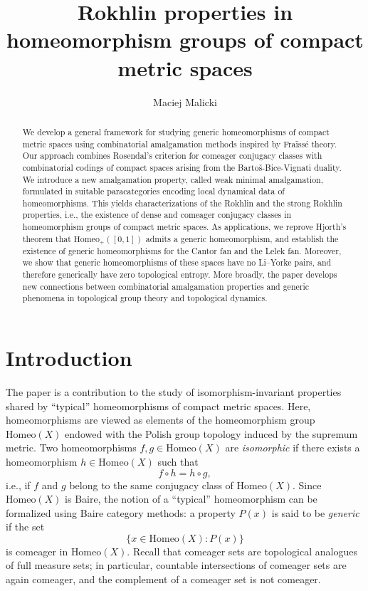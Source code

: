 \documentclass[12pt]{amsart}
\author[M. Malicki]{Maciej Malicki}
\numberwithin{equation}{section}
\theoremstyle{plain}
\theoremstyle{definition}
\newcommand \Homeo{ \mbox{Homeo}}
\begin{document}
	
\title[Rokhlin properties]{Rokhlin properties in homeomorphism groups of  compact metric spaces}
	
\begin{abstract}
We develop a general framework for studying generic homeomorphisms of compact metric spaces using combinatorial amalgamation methods inspired by Fraïssé theory. Our approach combines Rosendal’s criterion for comeager conjugacy classes with combinatorial codings of compact spaces arising from the Bartoš-Bice-Vignati duality. We introduce a new amalgamation property, called weak minimal amalgamation, formulated in suitable paracategories encoding local dynamical data of homeomorphisms. This yields characterizations of the Rokhlin and the strong Rokhlin properties, i.e., the existence of dense and comeager conjugacy classes in homeomorphism groups of compact metric spaces.
As applications, we reprove Hjorth’s theorem that $\Homeo_+([0,1])$ admits a generic homeomorphism, and establish the existence of generic homeomorphisms for the Cantor fan and the Lelek fan. Moreover, we show that generic homeomorphisms of these spaces have no Li–Yorke pairs, and therefore generically have zero topological entropy. More broadly, the paper develops new connections between combinatorial amalgamation properties and generic phenomena in topological group theory and topological dynamics.	
\end{abstract}
	
	\maketitle
	
	\setcounter{tocdepth}{2}
	
\section{Introduction}

The paper is a contribution to the study of isomorphism-invariant properties shared by ``typical'' homeomorphisms of compact metric spaces. Here, homeomorphisms are viewed as elements of the homeomorphism group $\Homeo(X)$ endowed with the Polish group topology induced by the supremum metric. Two homeomorphisms $f,g \in \Homeo(X)$ are \emph{isomorphic} if there exists a homeomorphism $h \in \Homeo(X)$ such that $$f \circ h=h \circ g,$$ i.e., if $f$ and $g$ belong to the same conjugacy class of $\Homeo(X)$. Since $\Homeo(X)$ is Baire, the notion of a ``typical'' homeomorphism can be formalized using Baire category methods: a property $P(x)$ is said to be \emph{generic} if the set
\[
\{x \in \Homeo(X): P(x)\}
\]
is comeager in $\Homeo(X)$. Recall that comeager sets are topological analogues of full measure sets; in particular, countable intersections of comeager sets are again comeager, and the complement of a comeager set is not comeager.
\end{document}
